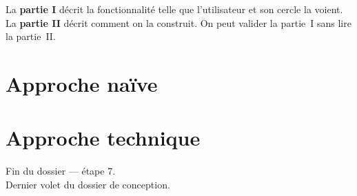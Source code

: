 \documentclass[11pt,a4paper,oneside]{report}
\begin{document}
\begin{note}
La \textbf{partie I} décrit la fonctionnalité telle que l'utilisateur et son cercle la
voient. La \textbf{partie II} décrit comment on la construit. On peut valider la partie~I
sans lire la partie~II.
\end{note}

\tableofcontents

\part{Approche naïve}



\part{Approche technique}



\vfill
\begin{center}\small\color{AlanyaGray}\sffamily
Fin du dossier --- étape 7. \\
Dernier volet du dossier de conception.
\end{center}
\end{document}
